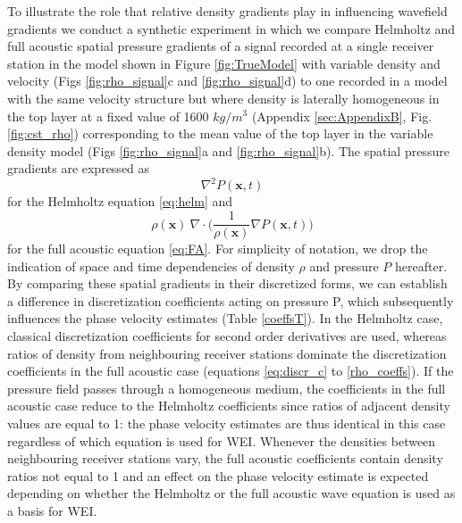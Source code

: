 \documentclass{article}
\begin{document}
	To illustrate the role that relative density gradients play in influencing wavefield gradients we conduct a synthetic experiment in which we compare Helmholtz and full acoustic spatial pressure gradients of a signal recorded at a single receiver station in the model shown in Figure \ref{fig:TrueModel} with variable density and velocity (Figs \ref{fig:rho_signal}c and \ref{fig:rho_signal}d) to one recorded in a model with the same velocity structure but where density is laterally homogeneous in the top layer at a fixed value of 1600 $kg/m^{3}$ (Appendix \ref{sec:AppendixB}, Fig. \ref{fig:cst_rho}) corresponding to the mean value of the top layer in the variable density model (Figs \ref{fig:rho_signal}a and \ref{fig:rho_signal}b). The spatial pressure gradients are expressed as 
	\begin{equation}\label{eq:spatial_HELM}
	\nabla^{2} P(\bm{x},t)
	\end{equation}
	for the Helmholtz equation \ref{eq:helm} and 
	\begin{equation}\label{eq:spatial_FA}
		\rho(\bm{x}) \: \nabla \cdot \bigg(\frac{1}{\rho(\bm{x})} \nabla P(\bm{x},t) \bigg)
	\end{equation}
	for the full acoustic equation \eqref{eq:FA}. For simplicity of notation, we drop the indication of space and time dependencies of density $\rho$ and pressure $P$ hereafter. By comparing these spatial gradients in their discretized forms, we can establish a difference in discretization coefficients acting on pressure P, which subsequently influences the phase velocity estimates (Table \ref{coeffsT}). In the Helmholtz case, classical discretization coefficients for second order derivatives are used, whereas ratios of density from neighbouring receiver stations dominate the discretization coefficients in the full acoustic case (equations \ref{eq:discr_c} to \ref{rho_coeffs}). If the pressure field passes through a homogeneous medium, the coefficients in the full acoustic case reduce to the Helmholtz coefficients since ratios of adjacent density values are equal to 1: the phase velocity estimates are thus identical in this case regardless of which equation is used for WEI. Whenever the densities between neighbouring receiver stations vary, the full acoustic coefficients contain density ratios not equal to 1 and an effect on the phase velocity estimate is expected depending on whether the Helmholtz or the full acoustic wave equation is used as a basis for WEI.\\
	
\end{document}
